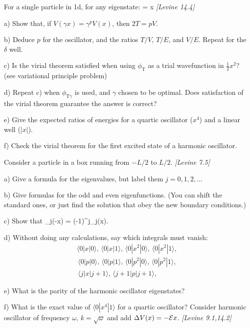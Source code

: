 \newpage
{}
For a single particle in 1d, for any eigenstate:
\langle{}\rangle = \langle x  \rangle
\ee
{\em [Levine 14.4]}

a) Show that, if $V(\gamma x) = \gamma^{p}V(x)$, then $2T = pV$.

b) Deduce $p$ for the oscillator, and the ratios $T/V$, $T/E$, and $V/E$.
Repeat for the $\delta$ well.

c) Is the virial theorem satisfied when using $\phi_{\text{T}}$ as a trial wavefunction
in $\frac{1}{2}x^2$? (see variational principle problem)

d) Repeat c) when $\phi_{\text{T}\gamma}$ is used, and $\gamma$ chosen to be
optimal. Does satisfaction of the virial theorem guarantee the answer is
correct?

e) Give the expected ratios of energies for a quartic oscillator ($x^4$) and a
linear well ($|x|$).

f) Check the virial theorem for the first excited state of a harmonic oscillator.

\newpage
{}
Consider a particle in a box running from $-L/2$ to $L/2$.
{\em [Levine 7.5]}

a) Give a formula for the eigenvalues, but label them $j=0,1,2,...$

b) Give formulas for the odd and even eigenfunctions. (You can shift the standard
ones, or just find the solution that obey the new boundary conditions.)

c) Show that
\be
   \phi_j(-x) = (-1)^j\phi_j(x).
\ee

d) Without doing any calculations, say which integrals must vanish:
\begin{align*}
   \langle 0|x|0\rangle,\,\langle 0|x|1 \rangle,\,\langle 0|x^2|0 \rangle,
   \,\langle 0|x^2|1 \rangle,\\
   \,\langle 0|p|0 \rangle,\,\langle 0|p|1 \rangle,\,\langle 0|p^2|0 \rangle,
   \,\langle 0|p^2|1 \rangle,\\
   \,\langle j|x|j+1 \rangle, \,\langle j+1|p|j+1 \rangle,
\end{align*}

e) What is the parity of the harmonic oscillator eigenstates?

f) What is the exact value of $\langle 0|x^4| 1\rangle$ for a quartic oscillator?
\newpage
{}
Consider harmonic oscillator of frequency $\omega$, $k=\sqrt{\omega}$ and add
$\Delta V(x) = -{\cal E} x$.
{\em [Levine 9.1,14.2]}

